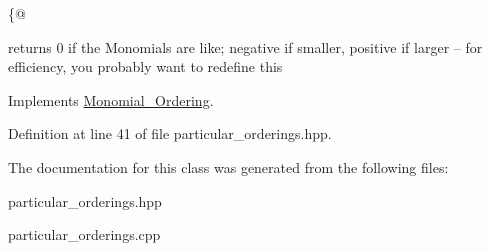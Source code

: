 \{@ 

returns 0 if the Monomials are like; negative if smaller, positive if larger -- for efficiency, you probably want to redefine this 

Implements \hyperlink{class_monomial___ordering_a9bc3155fc98b4d40c26118fa2114b827}{Monomial\+\_\+\+Ordering}.



Definition at line 41 of file particular\+\_\+orderings.\+hpp.



The documentation for this class was generated from the following files\+:\begin{DoxyCompactItemize}
\item 
particular\+\_\+orderings.\+hpp\item 
particular\+\_\+orderings.\+cpp\end{DoxyCompactItemize}
